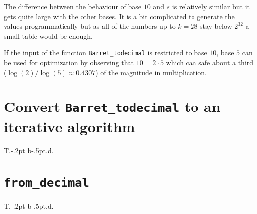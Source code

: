 \documentclass[a4paper,10pt]{article}
\theoremstyle{plain} %
\theoremstyle{definition}
\theoremstyle{remark}
\newcommand*{\smalltt}[1]{\small\texttt{#1}}
\begin{document}
The difference between the behaviour of base $10$ and $s$ is relatively similar but it gets quite large with the other bases. It is a bit complicated to generate the values programmatically but as all of the numbers up to $k=28$ stay below $2^{32}$ a small table would be enough.

If the input of the function \smalltt{Barret\_todecimal} is restricted to base $10$, base $5$ can be used for optimization by observing that $10 = 2\cdot5$ which can safe about a third ($\log(2)/\log(5) \approx 0.4307$) of the magnitude in multiplication.

\section{Convert \smalltt{Barret\_todecimal} to an iterative algorithm}

T.\kern-.2pt b\kern-.5pt.d.


\section{\smalltt{from\_decimal}}
T.\kern-.2pt b\kern-.5pt.d.
\end{document}
